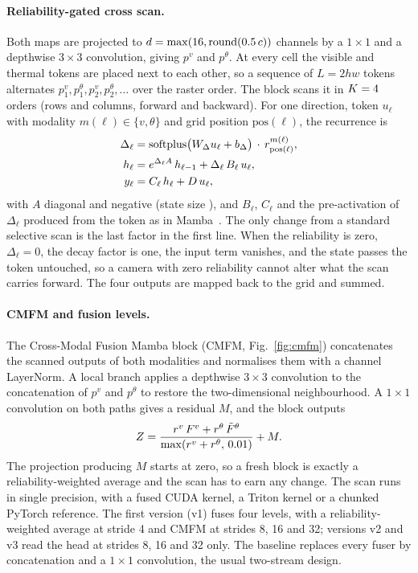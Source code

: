 \paragraph{Reliability-gated cross scan.}
Both maps are projected to $d=\max(16,\mathrm{round}(0.5{}\,c))$ channels by a $1{\times}1$ and a depthwise $3{\times}3$ convolution, giving $p^{v}$ and $p^{\theta}$. At every cell the visible and thermal tokens are placed next to each other, so a sequence of $L=2hw$ tokens alternates $p^{v}_1,p^{\theta}_1,p^{v}_2,p^{\theta}_2,\dots$ over the raster order. The block scans it in $K=4{}$ orders (rows and columns, forward and backward). For one direction, token $u_\ell$ with modality $m(\ell)\in\{v,\theta\}$ and grid position $\mathrm{pos}(\ell)$, the recurrence is
\begin{align}
\Delta_\ell &= \operatorname{softplus}\!\big(W_\Delta u_\ell + b_\Delta\big)\,\cdot\, r^{m(\ell)}_{\mathrm{pos}(\ell)},\\
h_\ell &= e^{\Delta_\ell A}\, h_{\ell-1} + \Delta_\ell\, B_\ell\, u_\ell,\\
y_\ell &= C_\ell\, h_\ell + D\, u_\ell,
\end{align}
with $A$ diagonal and negative (state size \cfgDState{}), and $B_\ell$, $C_\ell$ and the pre-activation of $\Delta_\ell$ produced from the token as in Mamba~\cite{gu2023mamba}. The only change from a standard selective scan is the last factor in the first line. When the reliability is zero, $\Delta_\ell=0$, the decay factor is one, the input term vanishes, and the state passes the token untouched, so a camera with zero reliability cannot alter what the scan carries forward. The four outputs are mapped back to the grid and summed.

\paragraph{CMFM and fusion levels.}
The Cross-Modal Fusion Mamba block (CMFM, Fig.~\ref{fig:cmfm}) concatenates the scanned outputs of both modalities and normalises them with a channel LayerNorm. A local branch applies a depthwise $3{\times}3$ convolution to the concatenation of $p^{v}$ and $p^{\theta}$ to restore the two-dimensional neighbourhood. A $1{\times}1$ convolution on both paths gives a residual $M$, and the block outputs
\begin{equation}
Z=\frac{r^{v}\,F^{v}+r^{\theta}\,\tilde F^{\theta}}{\max(r^{v}+r^{\theta},\,0.01{})}+M.
\end{equation}
The projection producing $M$ starts at zero, so a fresh block is exactly a reliability-weighted average and the scan has to earn any change. The scan runs in single precision, with a fused CUDA kernel, a Triton kernel or a chunked PyTorch reference. The first version (v1) fuses four levels, with a reliability-weighted average at stride 4 and CMFM at strides 8, 16 and 32; versions v2 and v3 read the head at strides 8, 16 and 32 only. The baseline replaces every fuser by concatenation and a $1{\times}1$ convolution, the usual two-stream design.

